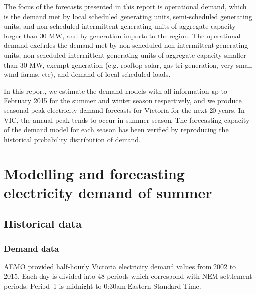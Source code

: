 \documentclass[11pt]{article}
\begin{document}
The focus of the forecasts presented in this report is operational demand, which is the demand met by local scheduled generating units, semi-scheduled generating units, and non-scheduled intermittent generating units of aggregate capacity larger than 30 MW, and by generation imports to the region. The operational demand excludes the demand met by non-scheduled non-intermittent generating units, non-scheduled intermittent generating units of aggregate capacity smaller than 30 MW, exempt generation (e.g. rooftop solar, gas tri-generation, very small wind farms, etc), and demand of local scheduled loads.

In this report, we estimate the demand models with all information up to February 2015 for the summer and winter season respectively, and we produce seasonal peak electricity demand forecasts for Victoria for the next 20 years. In VIC, the annual peak tends to occur in summer season. The forecasting capacity of the demand model for each season has been verified by reproducing the historical probability distribution of demand.

\newpage


\section{Modelling and forecasting electricity demand of summer}

\subsection{Historical data}

\subsubsection{Demand data}

AEMO provided half-hourly Victoria electricity demand values from 2002 to 2015.
Each day is divided into 48 periods which correspond with NEM settlement periods. Period~1 is midnight to 0:30am Eastern Standard Time.




\end{document}
